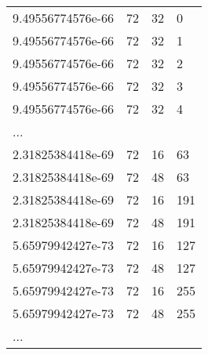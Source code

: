 \begin{table}[H]
\begin{center}
\begin{tabularx}{\textwidth}[]{XXXX}
            9.49556774576e-66  &  72  &  32  &  0 \\
            9.49556774576e-66  &  72  &  32  &  1 \\
            9.49556774576e-66  &  72  &  32  &  2 \\
            9.49556774576e-66  &  72  &  32  &  3 \\
            9.49556774576e-66  &  72  &  32  &  4 \\
            ... &&& \\
            2.31825384418e-69  &  72  &  16  &  63 \\
            2.31825384418e-69  &  72  &  48  &  63 \\
            2.31825384418e-69  &  72  &  16  &  191 \\
            2.31825384418e-69  &  72  &  48  &  191 \\
            5.65979942427e-73  &  72  &  16  &  127 \\
            5.65979942427e-73  &  72  &  48  &  127 \\
            5.65979942427e-73  &  72  &  16  &  255 \\
            5.65979942427e-73  &  72  &  48  &  255 \\
            ... &&& \\
            \hline
        \end{tabularx}
    \end{center}
\end{table}



